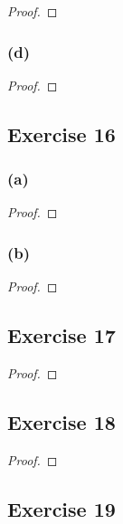 \documentclass[14pt]{extarticle}
\begin{document}
\begin{proof}

\end{proof}

\subsubsection{(d)}

\begin{proof}

\end{proof}

\subsection{Exercise 16}

\subsubsection{(a)}

\begin{proof}

\end{proof}

\subsubsection{(b)}

\begin{proof}

\end{proof}

\subsection{Exercise 17}

\begin{proof}

\end{proof}

\subsection{Exercise 18}

\begin{proof}

\end{proof}

\subsection{Exercise 19}
\end{document}
